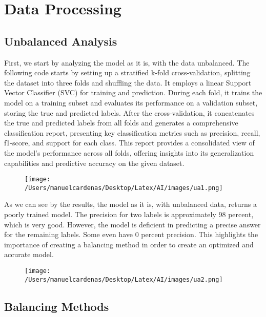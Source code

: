 \documentclass{article}
\begin{document}
\section{Data Processing}
    \subsection{Unbalanced Analysis}

    First, we start by analyzing the model as it is,  with the data unbalanced. 
    The following code starts by setting up a stratified k-fold cross-validation, splitting the dataset into three folds 
    and shuffling the data. It employs a linear Support Vector Classifier (SVC) for training and prediction. During each fold, 
    it trains the model on a training subset and evaluates its performance on a validation subset, storing the true and 
    predicted labels. After the cross-validation, it concatenates the true and predicted labels from all folds and generates 
    a comprehensive classification report, presenting key classification metrics such as precision, recall, f1-score, and support 
    for each class. This report provides a consolidated view of the model's performance across all folds, offering insights into 
    its generalization capabilities and predictive accuracy on the given dataset. \pagebreak
    \begin{figure}[h]
        \centering
        \texttt{[image: /Users/manuelcardenas/Desktop/Latex/AI/images/ua1.png]}
        \label{fig:ua1}
    \end{figure}
    
    As we can see by the results, the model as it is, with unbalanced data,  returns a poorly trained model. 
    The precision for two labels is approximately 98 percent, which is very good. However, the model is deficient in 
    predicting a precise answer for the remaining labels. Some even have 0 percent precision. This highlights the importance of creating 
    a balancing method in order to create an optimized and accurate model. \pagebreak
    \begin{figure}[h]
        \centering
        \texttt{[image: /Users/manuelcardenas/Desktop/Latex/AI/images/ua2.png]}
        \label{fig:ua2}
    \end{figure}


    \subsection{Balancing Methods}
\end{document}
